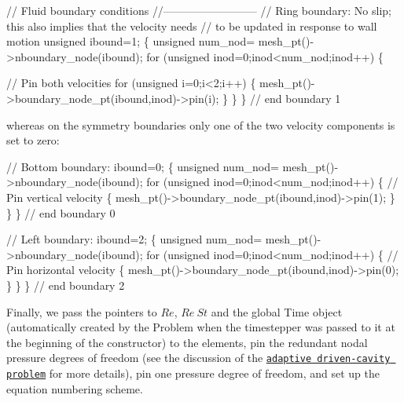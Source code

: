 \begin{DoxyCodeInclude}


 \textcolor{comment}{// Fluid boundary conditions}
 \textcolor{comment}{//--------------------------}
 \textcolor{comment}{// Ring boundary: No slip; this also implies that the velocity needs}
 \textcolor{comment}{// to be updated in response to wall motion}
 \textcolor{keywordtype}{unsigned} ibound=1;
 \{
  \textcolor{keywordtype}{unsigned} num\_nod= mesh\_pt()->nboundary\_node(ibound);
  \textcolor{keywordflow}{for} (\textcolor{keywordtype}{unsigned} inod=0;inod<num\_nod;inod++)
   \{
     
    \textcolor{comment}{// Pin both velocities}
    \textcolor{keywordflow}{for} (\textcolor{keywordtype}{unsigned} i=0;i<2;i++)
     \{
      mesh\_pt()->boundary\_node\_pt(ibound,inod)->pin(i);
     \}
   \}
 \} \textcolor{comment}{// end boundary 1}

\end{DoxyCodeInclude}


whereas on the symmetry boundaries only one of the two velocity components is set to zero\+:


\begin{DoxyCodeInclude}
 \textcolor{comment}{// Bottom boundary: }
 ibound=0;
 \{
  \textcolor{keywordtype}{unsigned} num\_nod= mesh\_pt()->nboundary\_node(ibound);
  \textcolor{keywordflow}{for} (\textcolor{keywordtype}{unsigned} inod=0;inod<num\_nod;inod++)
   \{
    \textcolor{comment}{// Pin vertical velocity}
    \{
     mesh\_pt()->boundary\_node\_pt(ibound,inod)->pin(1);
    \}
   \}
 \} \textcolor{comment}{// end boundary 0}

 \textcolor{comment}{// Left boundary:}
 ibound=2;
 \{
  \textcolor{keywordtype}{unsigned} num\_nod= mesh\_pt()->nboundary\_node(ibound);
  \textcolor{keywordflow}{for} (\textcolor{keywordtype}{unsigned} inod=0;inod<num\_nod;inod++)
   \{
    \textcolor{comment}{// Pin horizontal velocity}
    \{
     mesh\_pt()->boundary\_node\_pt(ibound,inod)->pin(0);
    \}
   \}
 \} \textcolor{comment}{// end boundary 2}

\end{DoxyCodeInclude}


Finally, we pass the pointers to $ Re $, $ Re \ St $ and the global {\ttfamily Time} object (automatically created by the {\ttfamily Problem} when the timestepper was passed to it at the beginning of the constructor) to the elements, pin the redundant nodal pressure degrees of freedom (see the discussion of the \href{../../../navier_stokes/adaptive_driven_cavity/html/index.html}{\tt adaptive driven-\/cavity problem} for more details), pin one pressure degree of freedom, and set up the equation numbering scheme.


